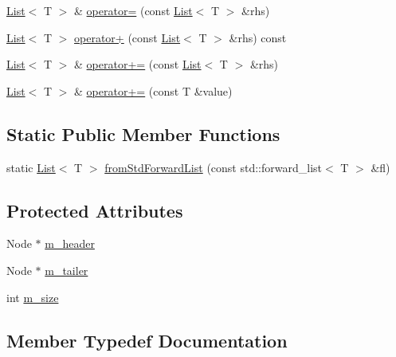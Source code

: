 \begin{DoxyCompactItemize}
\item 
\hyperlink{classprism_1_1_list}{List}$<$ T $>$ \& \hyperlink{classprism_1_1_list_abb977e2c0b880c7a381ea14f25417e4f}{operator=} (const \hyperlink{classprism_1_1_list}{List}$<$ T $>$ \&rhs)
\item 
\hyperlink{classprism_1_1_list}{List}$<$ T $>$ \hyperlink{classprism_1_1_list_ad578cb4c80ff86d9edb989ade883c18f}{operator+} (const \hyperlink{classprism_1_1_list}{List}$<$ T $>$ \&rhs) const 
\item 
\hyperlink{classprism_1_1_list}{List}$<$ T $>$ \& \hyperlink{classprism_1_1_list_a84972c1e847fdf2c2ca197d7812af3a0}{operator+=} (const \hyperlink{classprism_1_1_list}{List}$<$ T $>$ \&rhs)
\item 
\hyperlink{classprism_1_1_list}{List}$<$ T $>$ \& \hyperlink{classprism_1_1_list_a5e68dad596d72d1c00f9d12bb21479d6}{operator+=} (const T \&value)
\end{DoxyCompactItemize}
\subsection*{Static Public Member Functions}
\begin{DoxyCompactItemize}
\item 
static \hyperlink{classprism_1_1_list}{List}$<$ T $>$ \hyperlink{classprism_1_1_list_a5dd072cd1d777dd751fc2d0deee00e31}{from\+Std\+Forward\+List} (const std\+::forward\+\_\+list$<$ T $>$ \&fl)
\end{DoxyCompactItemize}
\subsection*{Protected Attributes}
\begin{DoxyCompactItemize}
\item 
Node $\ast$ \hyperlink{classprism_1_1_list_ade9dd1234d468fdcbcddb16eb490d296}{m\+\_\+header}
\item 
Node $\ast$ \hyperlink{classprism_1_1_list_a0740989f0d5af2bad19850fac850947e}{m\+\_\+tailer}
\item 
int \hyperlink{classprism_1_1_list_ae86f48e50ec12239597de98deb36b4a4}{m\+\_\+size}
\end{DoxyCompactItemize}


\subsection{Member Typedef Documentation}

